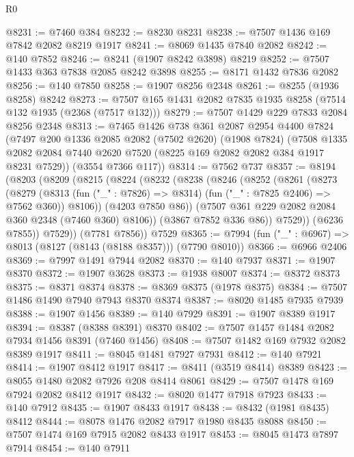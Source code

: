 \begin{lexlean}{R0}
\begin{coremodule}
@8231 := @7460 @384
@8232 := @8230 @8231
@8238 := @7507 @1436 @169 @7842 @2082 @8219 @1917
@8241 := @8069 @1435 @7840 @2082
@8242 := @140 @7852
@8246 := @8241 (@1907 @8242 @3898) @8219
@8252 := @7507 @1433 @363 @7838 @2085 @8242 @3898
@8255 := @8171 @1432 @7836 @2082
@8256 := @140 @7850
@8258 := @1907 @8256 @2348
@8261 := @8255 (@1936 @8258) @8242
@8273 := @7507 @165 @1431 @2082 @7835 @1935 @8258 (@7514 @132 @1935 (@2368 (@7517 @132)))
@8279 := @7507 @1429 @229 @7833 @2084 @8256 @2348
@8313 := @7465
    @1426
    @738
    @361
    @2087
    @2954
    @4400
    @7824
    (@7497
      @200
      @1336
      @2085
      @2082
      (@7502 @2620)
      (@1908 @7824)
      (@7508 @1335 @2082 @2084 @7440 @2620 @7520 (@8225 @169 @2082 @2082 @384 @1917 @8231 @7529))
      (@3554 @7366 @117))
@8314 := @7562 @737
@8357 := @8194
    (@8203
      (@8209
        (@8215
          (@8224
            (@8232
              (@8238
                (@8246
                  (@8252
                    (@8261
                      (@8273
                        (@8279
                          (@8313
                            (fun ("_" : @7826) => @8314)
                            (fun ("_" : @7825 @2406) => @7562 @360))
                          @8106))
                      (@4203 @7850 @86))
                    (@7507 @361 @229 @2082 @2084 @360 @2348 (@7460 @360) @8106))
                  (@3867 @7852 @336 @86))
                @7529))
            (@6236 @7855))
          @7529))
      (@7781 @7856))
    @7529
@8365 := @7994 (fun ("_" : @6967) => @8013 (@8127 (@8143 (@8188 @8357))) (@7790 @8010))
@8366 := @6966 @2406
@8369 := @7997 @1491 @7944 @2082
@8370 := @140 @7937
@8371 := @1907 @8370
@8372 := @1907 @3628
@8373 := @1938 @8007
@8374 := @8372 @8373
@8375 := @8371 @8374
@8378 := @8369 @8375 (@1978 @8375)
@8384 := @7507 @1486 @1490 @7940 @7943 @8370 @8374
@8387 := @8020 @1485 @7935 @7939
@8388 := @1907 @1456
@8389 := @140 @7929
@8391 := @1907 @8389 @1917
@8394 := @8387 (@8388 @8391) @8370
@8402 := @7507 @1457 @1484 @2082 @7934 @1456 @8391 (@7460 @1456)
@8408 := @7507 @1482 @169 @7932 @2082 @8389 @1917
@8411 := @8045 @1481 @7927 @7931
@8412 := @140 @7921
@8414 := @1907 @8412 @1917
@8417 := @8411 (@3519 @8414) @8389
@8423 := @8055 @1480 @2082 @7926 @208 @8414 @8061
@8429 := @7507 @1478 @169 @7924 @2082 @8412 @1917
@8432 := @8020 @1477 @7918 @7923
@8433 := @140 @7912
@8435 := @1907 @8433 @1917
@8438 := @8432 (@1981 @8435) @8412
@8444 := @8078 @1476 @2082 @7917 @1980 @8435 @8088
@8450 := @7507 @1474 @169 @7915 @2082 @8433 @1917
@8453 := @8045 @1473 @7897 @7914
@8454 := @140 @7911

\end{coremodule}
\end{lexlean}
